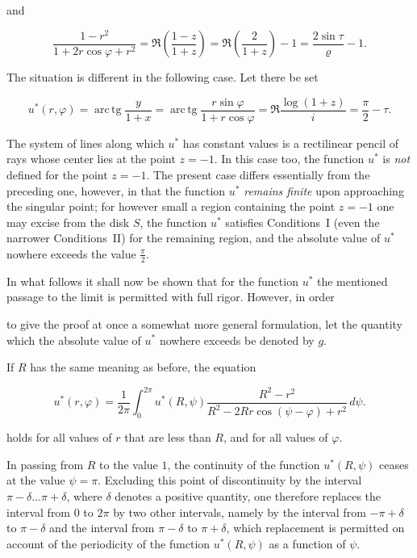 \documentclass{article}
\begin{document}
and

\[

\frac{1 - r^2}{1 + 2r \cos\varphi + r^2} = \Re\left(\frac{1 - z}{1 + z}\right) = \Re\left(\frac{2}{1 + z}\right) - 1 = \frac{2\sin\tau}{\varrho} - 1.

\]



The situation is different in the following case. Let there be set

\[

u^*(r, \varphi) = \operatorname{arc\,tg}\frac{y}{1 + x} = \operatorname{arc\,tg}\frac{r\sin\varphi}{1 + r\cos\varphi} = \Re\frac{\log(1 + z)}{i} = \frac{\pi}{2} - \tau.

\]



The system of lines along which $u^*$ has constant values is a rectilinear pencil of rays whose center lies at the point $z = -1$. In this case too, the function $u^*$ is \emph{not} defined for the point $z = -1$. The present case differs essentially from the preceding one, however, in that the function $u^*$ \emph{remains finite} upon approaching the singular point; for however small a region containing the point $z = -1$ one may excise from the disk $S$, the function $u^*$ satisfies Conditions~I (even the narrower Conditions~II) for the remaining region, and the absolute value of $u^*$ nowhere exceeds the value $\frac{\pi}{2}$.



In what follows it shall now be shown that for the function $u^*$ the mentioned passage to the limit is permitted with full rigor. However, in order




to give the proof at once a somewhat more general formulation, let the quantity which the absolute value of $u^*$ nowhere exceeds be denoted by $g$.



If $R$ has the same meaning as before, the equation

\[

u^*(r, \varphi) = \frac{1}{2\pi} \int_0^{2\pi} u^*(R, \psi) \frac{R^2 - r^2}{R^2 - 2Rr \cos(\psi - \varphi) + r^2}\,d\psi.

\]

holds for all values of $r$ that are less than $R$, and for all values of $\varphi$.



In passing from $R$ to the value $1$, the continuity of the function $u^*(R, \psi)$ ceases at the value $\psi = \pi$. Excluding this point of discontinuity by the interval $\pi - \delta \dots \pi + \delta$, where $\delta$ denotes a positive quantity, one therefore replaces the interval from $0$ to $2\pi$ by two other intervals, namely by the interval from $-\pi + \delta$ to $\pi - \delta$ and the interval from $\pi - \delta$ to $\pi + \delta$, which replacement is permitted on account of the periodicity of the function $u^*(R, \psi)$ as a function of $\psi$.
\end{document}
